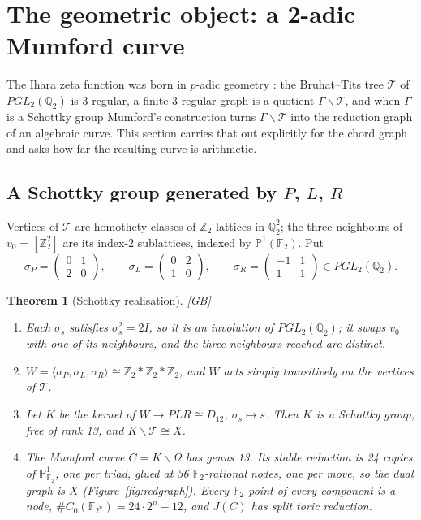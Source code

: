 \documentclass[11pt]{amsart}
\numberwithin{equation}{section}
\theoremstyle{plain}
\newtheorem{theorem}{Theorem}[section]
\theoremstyle{definition}\newtheorem{definition}[theorem]{Definition}
\theoremstyle{remark}\newtheorem{remark}[theorem]{Remark}
\newcommand{\Z}{\mathbb{Z}}\newcommand{\Q}{\mathbb{Q}}\newcommand{\C}{\mathbb{C}}\newcommand{\F}{\mathbb{F}}\newcommand{\R}{\mathbb{R}}
\newcommand{\ctag}[1]{\textup{\textsf{\scriptsize[#1]}}}
\begin{document}
\section{The geometric object: a 2-adic Mumford curve}\label{sec:geom}
The Ihara zeta function was born in $p$-adic geometry \cite{ihara66,serre80}: the Bruhat--Tits tree $\mathcal T$ of $PGL_2(\Q_2)$ is 3-regular, a finite 3-regular graph is a quotient $\Gamma\backslash\mathcal T$, and when $\Gamma$ is a Schottky group Mumford's construction \cite{mumford72,gvdp80} turns $\Gamma\backslash\mathcal T$ into the reduction graph of an algebraic curve. This section carries that out explicitly for the chord graph and asks how far the resulting curve is arithmetic.

\subsection{\texorpdfstring{A Schottky group generated by $P$, $L$, $R$}{A Schottky group generated by P, L, R}}
Vertices of $\mathcal T$ are homothety classes of $\Z_2$-lattices in $\Q_2^2$; the three neighbours of $v_0=[\Z_2^2]$ are its index-2 sublattices, indexed by $\mathbb P^1(\F_2)$. Put
\[\sigma_P=\begin{pmatrix}0&1\\2&0\end{pmatrix},\qquad \sigma_L=\begin{pmatrix}0&2\\1&0\end{pmatrix},\qquad \sigma_R=\begin{pmatrix}-1&1\\1&1\end{pmatrix}\in PGL_2(\Q_2).\]
\begin{theorem}[Schottky realisation]\label{thm:schottky}
\ctag{GB}\ \begin{enumerate}[label=(\alph*),nosep]
\item Each $\sigma_s$ satisfies $\sigma_s^2=2I$, so it is an involution of $PGL_2(\Q_2)$; it swaps $v_0$ with one of its neighbours, and the three neighbours reached are distinct.
\item $W=\langle\sigma_P,\sigma_L,\sigma_R\rangle\cong\Z_2*\Z_2*\Z_2$, and $W$ acts simply transitively on the vertices of $\mathcal T$.
\item Let $K$ be the kernel of $W\to PLR\cong D_{12}$, $\sigma_s\mapsto s$. Then $K$ is a Schottky group, free of rank 13, and $K\backslash\mathcal T\cong X$.
\item The Mumford curve $C=K\backslash\Omega$ has genus 13. Its stable reduction is 24 copies of $\mathbb P^1_{\F_2}$, one per triad, glued at 36 $\F_2$-rational nodes, one per move, so the dual graph is $X$ (Figure~\ref{fig:redgraph}). Every $\F_2$-point of every component is a node, $\#C_0(\F_{2^n})=24\cdot2^n-12$, and $J(C)$ has split toric reduction.
\end{enumerate}
\end{theorem}
\end{document}
